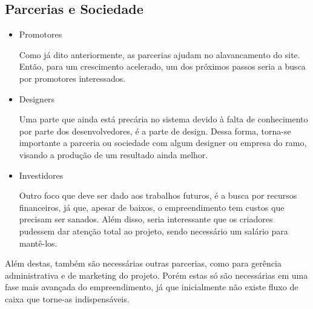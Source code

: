 \subsection{Parcerias e Sociedade}
\begin{itemize}

\item Promotores

Como já dito anteriormente, as parcerias ajudam no alavancamento do site. Então, para um crescimento acelerado, um dos próximos passos seria a busca por promotores interessados.

\item Designers

Uma parte que ainda está precária no sistema devido à falta de conhecimento por parte dos desenvolvedores, é a parte de design. Dessa forma, torna-se importante a parceria ou sociedade com algum designer ou empresa do ramo, visando a produção de um resultado ainda melhor.

\item Investidores

Outro foco que deve ser dado aos trabalhos futuros, é a busca por recursos financeiros, já que, apesar de baixos, o empreendimento tem custos que precisam ser sanados. Além disso, seria interessante que os criadores pudessem dar atenção total ao projeto, sendo necessário um salário para mantê-los.

\end{itemize}

Além destas, também são necessárias outras parcerias, como para gerência administrativa e de marketing do projeto. Porém estas só são necessárias em uma fase mais avançada do empreendimento, já que inicialmente não existe fluxo de caixa que torne-as indispensáveis.